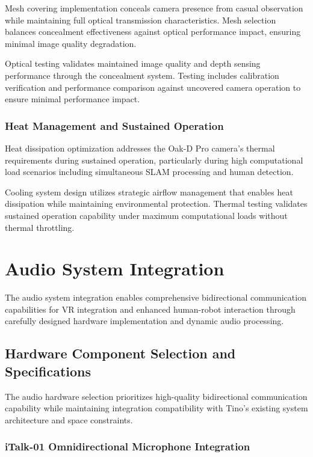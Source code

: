 Mesh covering implementation conceals camera presence from casual observation while maintaining full optical transmission characteristics. Mesh selection balances concealment effectiveness against optical performance impact, ensuring minimal image quality degradation.

Optical testing validates maintained image quality and depth sensing performance through the concealment system. Testing includes calibration verification and performance comparison against uncovered camera operation to ensure minimal performance impact.

\subsubsection{Heat Management and Sustained Operation}

Heat dissipation optimization addresses the Oak-D Pro camera's thermal requirements during sustained operation, particularly during high computational load scenarios including simultaneous SLAM processing and human detection.

Cooling system design utilizes strategic airflow management that enables heat dissipation while maintaining environmental protection. Thermal testing validates sustained operation capability under maximum computational loads without thermal throttling.

\section{Audio System Integration}

The audio system integration enables comprehensive bidirectional communication capabilities for VR integration and enhanced human-robot interaction through carefully designed hardware implementation and dynamic audio processing.

\subsection{Hardware Component Selection and Specifications}

The audio hardware selection prioritizes high-quality bidirectional communication capability while maintaining integration compatibility with Tino's existing system architecture and space constraints.

\subsubsection{iTalk-01 Omnidirectional Microphone Integration}

